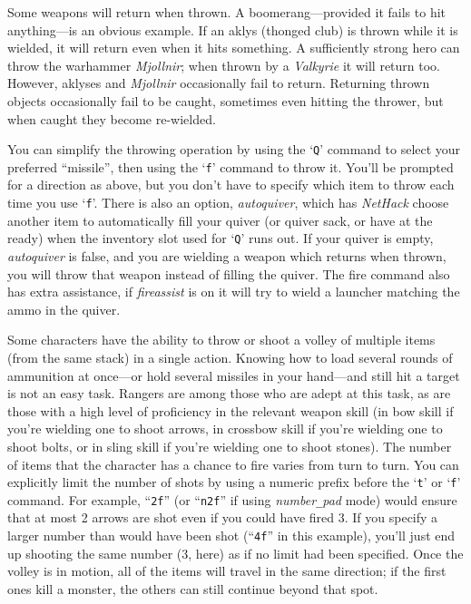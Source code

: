 Some weapons will return when thrown.
A boomerang---provided it fails to hit anything---is an obvious example.
If an aklys (thonged club) is thrown while it is wielded, it will return
even when it hits something.
A sufficiently strong hero can throw the warhammer {\it Mjollnir\/};
when thrown by a {\it Valkyrie\/} it will return too.
However, aklyses and {\it Mjollnir\/} occasionally fail to return.
Returning thrown objects occasionally fail to be caught, sometimes even
hitting the thrower, but when caught they become re-wielded.

You can simplify the throwing operation by using the `{\tt Q}' command to
select your preferred ``missile'', then using the `{\tt f}' command to
throw it.  You'll be prompted for a direction as above, but you don't
have to specify which item to throw each time you use `{\tt f}'.  There is
also an option,
{\it autoquiver},
which has {\it NetHack\/} choose another item to automatically fill your
quiver (or quiver sack, or have at the ready) when the inventory slot used
for `{\tt Q}' runs out.
If your quiver is empty, {\it autoquiver\/}
is false, and you are wielding a weapon which returns when thrown,
you will throw that weapon instead of filling the quiver.
The fire command also has extra assistance, if {\it fireassist\/}
is on it will try to wield a launcher matching the ammo in the quiver.

Some characters have the ability to throw or shoot a volley of multiple
items (from the same stack) in a single action.
Knowing how to load several rounds of ammunition at
once---or hold several missiles in your hand---and
still hit a target is not an easy task.
Rangers are among those who are adept
at this task, as are those with a high level of proficiency in the
relevant weapon skill (in bow skill if you're wielding one to
shoot arrows, in crossbow skill if you're wielding one to shoot bolts,
or in sling skill if you're wielding one to shoot stones).
The number of items that the character has a chance to fire varies from
turn to turn.  You can explicitly limit the number of shots by using a
numeric prefix before the `{\tt t}' or `{\tt f}' command.
For example, ``{\tt 2f}'' (or ``{\tt n2f}'' if using
{\it number\verb+_+pad\/}
mode) would ensure that at most 2 arrows are shot
even if you could have fired 3.  If you specify
a larger number than would have been shot (``{\tt 4f}'' in this example),
you'll just end up shooting the same number (3, here) as if no limit
had been specified.  Once the volley is in motion, all of the items
will travel in the same direction; if the first ones kill a monster,
the others can still continue beyond that spot.

